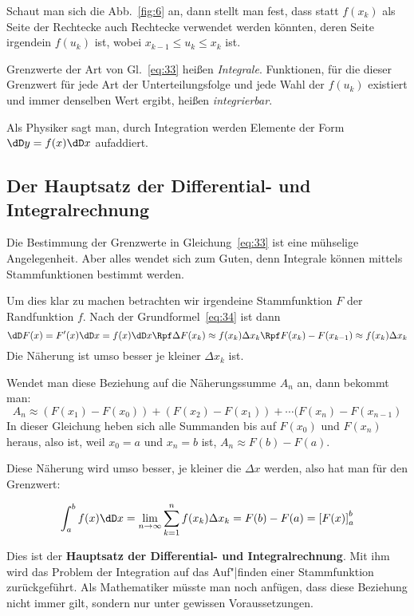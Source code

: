Schaut man sich die Abb.~\ref{fig:6} an, dann stellt man fest, dass statt
$f(x_k)$ als Seite der Rechtecke auch Rechtecke verwendet werden könnten,
deren Seite irgendein $f(u_k)$ ist, wobei $x_{k-1}\le u_k\le x_k$ ist.

Grenzwerte der Art von Gl.~\eqref{eq:33} heißen \emph{Integrale}. Funktionen,
für die dieser Grenzwert für jede Art der Unterteilungsfolge und jede Wahl der
$f(u_k)$ existiert und immer denselben Wert ergibt, heißen \emph{integrierbar}.

Als Physiker sagt man, durch Integration werden Elemente der Form  $\dD
y=f(x)\dD x$
aufaddiert.

\subsection[Der Hauptsatz]{Der Hauptsatz der Differential- und
  Integralrechnung}
Die Bestimmung der Grenzwerte in Gleichung~\eqref{eq:33} ist eine mühselige
Angelegenheit. Aber alles wendet sich zum Guten, denn Integrale können mittels
Stammfunktionen bestimmt werden.

Um dies klar zu machen betrachten wir irgendeine Stammfunktion $F$ der
Randfunktion $f$. Nach der Grundformel~\eqref{eq:34} ist dann
\[
\dD F(x)=F'(x)\dD x=f(x)\dD x\Rpf
\Delta F(x_k)\approx f(x_k)\Delta x_k\Rpf
F(x_k)-F(x_{k-1})\approx f(x_k)\Delta x_k
\]
Die Näherung ist umso besser je kleiner $\Delta x_k$ ist.

Wendet man diese Beziehung auf die Näherungssumme $A_n$ an, dann bekommt man:
\[
A_n\approx(F(x_1)-F(x_0))+(F(x_2)-F(x_1))+\cdots (F(x_n)-F(x_{n-1})
\]
In dieser Gleichung heben sich alle Summanden bis auf $F(x_0)$ und $F(x_n)$
heraus, also ist, weil $x_0=a$ und $x_n=b$ ist, $A_n\approx F(b)-F(a)$.

Diese Näherung wird umso besser, je kleiner die $\Delta x$ werden, also hat
man für den Grenzwert:
\begin{merkbox}
\begin{equation}
  \label{eq:35}
  \int_a^b f(x)\dD x
  =\lim_{n\to\infty}\sum_{k=1}^n f(x_k)\Delta x_k = F(b) - F(a)
  =\left[F(x)\right]_a^b
\end{equation}
\end{merkbox}
Dies ist der \textbf{Hauptsatz der Differential- und Integralrechnung}. Mit
ihm wird das Problem der Integration auf das Auf"|finden einer Stammfunktion
zurückgeführt. Als Mathematiker müsste man noch anfügen, dass diese Beziehung
nicht immer gilt, sondern nur unter gewissen Voraussetzungen.

